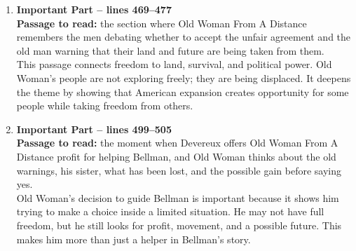 \documentclass[11pt,a4paper]{article}
\begin{document}
\begin{enumerate}[label=\textbf{\arabic*.}, leftmargin=*]
    \item \textbf{Important Part -- lines 469--477}\\
    \textbf{Passage to read:} the section where Old Woman From A Distance remembers the men debating whether to accept the unfair agreement and the old man warning that their land and future are being taken from them.\\
    This passage connects freedom to land, survival, and political power. Old Woman's people are not exploring freely; they are being displaced. It deepens the theme by showing that American expansion creates opportunity for some people while taking freedom from others.

    \item \textbf{Important Part -- lines 499--505}\\
    \textbf{Passage to read:} the moment when Devereux offers Old Woman From A Distance profit for helping Bellman, and Old Woman thinks about the old warnings, his sister, what has been lost, and the possible gain before saying yes.\\
    Old Woman's decision to guide Bellman is important because it shows him trying to make a choice inside a limited situation. He may not have full freedom, but he still looks for profit, movement, and a possible future. This makes him more than just a helper in Bellman's story.
\end{enumerate}
\end{document}

